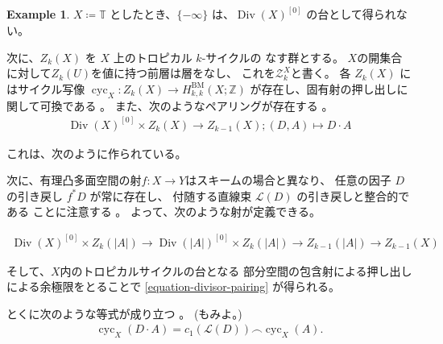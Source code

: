 \documentclass[a4paper,dvipdfmx,reqno,12pt]{amsart}
\theoremstyle{definition}
\newtheorem{example}[theorem]{Example}
\newcommand{\deq}{\coloneqq}
\newcommand{\opn}[1]{\operatorname{#1}}
\numberwithin{equation}{section}
\begin{document}
\begin{example}
$X\deq \mathbb{T}$ としたとき、$\{-\infty\}$
は、$\opn{Div}(X)^{[0]}$ の台として得られない。
\end{example}

次に、$Z_k(X)$ を $X$ 上のトロピカル $k$-サイクルの
なす群とする\cite[Definition 3.5]{gross2019sheaftheoretic}。
$X$の開集合に対して$Z_k(U)$を値に持つ前層は層をなし、
これを$\mathscr{Z}_k^{X}$と書く。
各 $Z_k(X)$ にはサイクル写像
$\opn{cyc}_X \colon Z_k(X)\to 
H^{\mathrm{BM}}_{k,k}(X;\mathbb{Z})$
が存在し、固有射の押し出しに関して可換である
\cite[Definition 5.4 and Corollary 5.8]{gross2019sheaftheoretic}。
また、次のようなペアリングが存在する
\cite[]{gross2019sheaftheoretic}。
\begin{align}
\label{equation-divisor-pairing}
\opn{Div}(X)^{[0]}\times Z_{k}(X)\to Z_{k-1}(X);
(D,A) \mapsto D\cdot A
\end{align}

これは、次のように作られている。

次に、有理凸多面空間の射$f\colon X\to Y$はスキームの場合と異なり、
任意の因子 $D$ の引き戻し $f^{*}D$ が常に存在し、
付随する直線束 $\mathcal{L}(D)$ の引き戻しと整合的である
ことに注意する
\cite[Propoisition 3.15]{gross2019sheaftheoretic}。
よって、次のような射が定義できる。

\begin{align}
\opn{Div}(X)^{[0]}\times Z_{k}(|A|) \to 
\opn{Div}(|A|)^{[0]} \times Z_{k}(|A|) \to
Z_{k-1}(|A|) \to
Z_{k-1}(X)
\end{align}

そして、$X$内のトロピカルサイクルの台となる
部分空間の包含射による押し出し
による余極限をとることで
\cref{equation-divisor-pairing} が得られる。


とくに次のような等式が成り立つ
\cite[Proposition 5.12]{gross2019sheaftheoretic}。
(\cite[Theorem 4.15]{MR3894860}もみよ。)
\begin{align}
\opn{cyc}_X(D\cdot A)=c_1(\mathcal{L}(D))
\frown \opn{cyc}_X(A).
\end{align}
\end{document}

